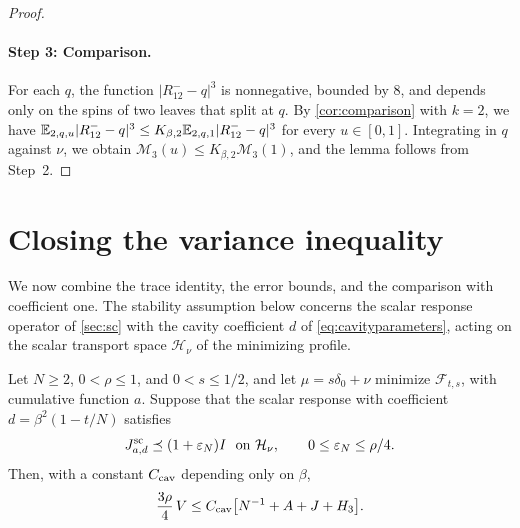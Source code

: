 \begin{proof}
\paragraph{Step 3: Comparison.} For each $q$, the function
$|R^-_{12}-q|^3$ is nonnegative, bounded by $8$, and depends only on the
spins of two leaves that split at $q$. By \cref{cor:comparison} with
$k=2$, we have
$\mathbb E_{2,q,u}|R^-_{12}-q|^3\le K_{\beta,2}\mathbb E_{2,q,1}|R^-_{12}-q|^3$ for
every $u\in[0,1]$. Integrating in $q$ against $\nu$, we obtain
$\mathcal M_3(u)\le K_{\beta,2}\mathcal M_3(1)$, and the lemma follows
from Step~2.
\end{proof}

\section{Closing the variance inequality}\label{sec:c7-closing}

We now combine the trace identity, the error bounds, and the comparison
with coefficient one. The stability assumption below concerns the
scalar response operator of \cref{sec:sc} with the cavity coefficient
$d$ of \eqref{eq:cavityparameters}, acting on the scalar transport space
$\mathcal H_\nu$ of the minimizing profile.

\begin{proposition}\label{prop:c7-closure}
Let $N\ge2$, $0<\rho\le1$, and $0<s\le1/2$, and let $\mu=s\delta_0+\nu$
minimize $\mathcal F_{t,s}$, with cumulative function $a$. Suppose that
the scalar response with coefficient $d=\beta^2(1-t/N)$ satisfies
\begin{equation}\label{eq:c7-stab}
 J^{\mathrm{sc}}_{a,d}\preceq(1+\varepsilon_N)I\ \text{ on }\mathcal H_\nu,
 \qquad 0\le\varepsilon_N\le\rho/4 .
\end{equation}
Then, with a constant $C_{\rm cav}$ depending only on $\beta$,
\begin{equation}\label{eq:c7-C1}
 \frac{3\rho}{4}\,V\le C_{\rm cav}\bigl[N^{-1}+A+J+H_3\bigr].
\end{equation}
\end{proposition}

